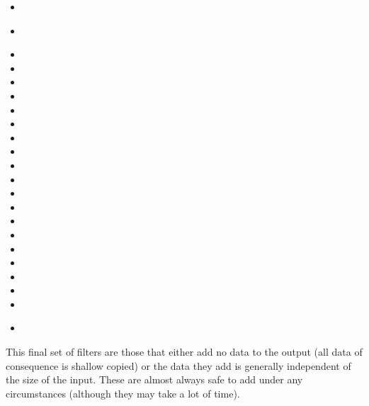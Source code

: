 \begin{multicols}{2}
  \begin{itemize}
  \item {}
  \item {}~\calculator
  \item {}
  \item {}
  \item {}
  \item {}
  \item {}
  \item {}
  \item {}
  \item {}
  \item {}
  \item {}
  \item {}
  \item {}
  \item {}
  \item {}
  \item {}
  \item {}
  \item {}
  \item {}
  \item {}
  \item {}~\warp
  \end{itemize}
\end{multicols}

This final set of filters are those that either add no data to the output
(all data of consequence is shallow copied) or the data they add is
generally independent of the size of the input.  These are almost always
safe to add under any circumstances (although they may take a lot of time).


